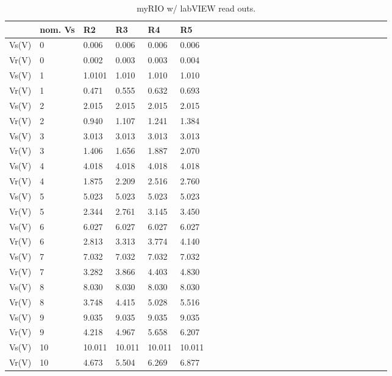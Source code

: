 \documentclass[10pt,twocolumn]{article}
\begin{document}
\begin{table}
	\begin{tabularx}{1\linewidth}{ lXXXXX|cXXXXXXXXXXXXXXXXXXXX }
		\hline
		 & \textbf{nom. Vs} & \textbf{R2} & \textbf{R3} & \textbf{R4} & \textbf{R5}\\
		\hline
		Vs(V) & 0 & 0.006 & 0.006 & 0.006 & 0.006 \\
		Vr(V) & 0 & 0.002 & 0.003 & 0.003 & 0.004 \\
		\cline{1-6}
		Vs(V) & 1 & 1.0101 & 1.010 & 1.010 & 1.010 \\
		Vr(V) & 1 & 0.471 & 0.555 & 0.632 & 0.693 \\
		\cline{1-6}
		Vs(V) & 2 & 2.015 & 2.015 & 2.015 & 2.015 \\
		Vr(V) & 2 & 0.940 & 1.107 & 1.241 & 1.384 \\
		\cline{1-6}
		Vs(V) & 3 & 3.013 & 3.013 & 3.013 & 3.013 \\
		Vr(V) & 3 & 1.406 & 1.656 & 1.887 & 2.070 \\
		\cline{1-6}
		Vs(V) & 4 & 4.018 & 4.018 & 4.018 & 4.018 \\
		Vr(V) & 4 & 1.875 & 2.209 & 2.516 & 2.760 \\
		\cline{1-6}
		Vs(V) & 5 & 5.023 & 5.023 & 5.023 & 5.023 \\
		Vr(V) & 5 & 2.344 & 2.761 & 3.145 & 3.450 \\
		\cline{1-6}
		Vs(V) & 6 & 6.027 & 6.027 & 6.027 & 6.027 \\
		Vr(V) & 6 & 2.813 & 3.313 & 3.774 & 4.140 \\
		\cline{1-6}
		Vs(V) & 7 & 7.032 & 7.032 & 7.032 & 7.032 \\
		Vr(V) & 7 & 3.282 & 3.866 & 4.403 & 4.830 \\
		\cline{1-6}
		Vs(V) & 8 & 8.030 & 8.030 & 8.030 & 8.030 \\
		Vr(V) & 8 & 3.748 & 4.415 & 5.028 & 5.516 \\
		\cline{1-6}
		Vs(V) & 9 & 9.035 & 9.035 & 9.035 & 9.035 \\
		Vr(V) & 9 & 4.218 & 4.967 & 5.658 & 6.207 \\
		\cline{1-6}
		Vs(V) & 10 & 10.011 & 10.011 & 10.011 & 10.011 \\
		Vr(V) & 10 & 4.673 & 5.504 & 6.269 & 6.877 \\
		\hline
	\end{tabularx}
	\caption{myRIO w/ labVIEW read outs.}
	\label{tab:Tab2}
\end{table}
\end{document}
